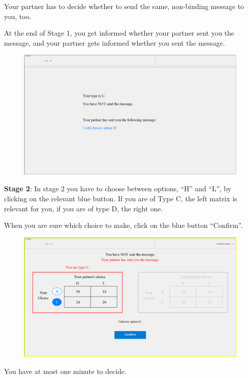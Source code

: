 \documentclass[12pt]{article}
\theoremstyle{break}
\begin{document}
Your partner has to decide whether to send the same, non-binding message to you, too.

At the end of Stage 1, you get informed whether your partner sent you the message, and your partner gets informed whether you sent the message. 

\begin{figure}[h]
  \centering
    \includegraphics[width=.9\textwidth]{fig2-CT-instructions.png}
\label{fig:fig2-CT-instructions}
\end{figure}


\textbf{Stage 2}: In stage 2 you have to choose between options, ``H'' and ``L'', by clicking on the relevant blue button. 
If you are of Type C, the left matrix is relevant for you, if you are of type D, the right one.

When you are sure which choice to make, click on the blue button ``Confirm''.

 \begin{figure}[h]
   \centering
     \includegraphics[width=.9\textwidth]{fig3-FC-instructions.png}
   \label{fig:fig3-FC-instructions}
 \end{figure}
 

You have at most one minute to decide.
\end{document}

